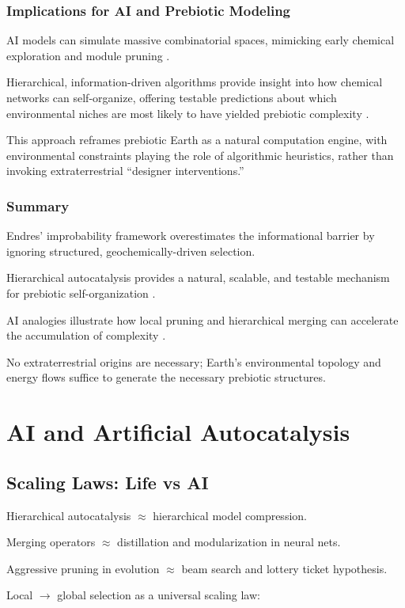 \documentclass{book}
\begin{document}
\section{Implications for AI and Prebiotic Modeling}
AI models can simulate massive combinatorial spaces, mimicking early chemical exploration and module pruning \citep{scalinghypothesis}.

Hierarchical, information-driven algorithms provide insight into how chemical networks can self-organize, offering testable predictions about which environmental niches are most likely to have yielded prebiotic complexity \citep{peng2020}.

This approach reframes prebiotic Earth as a natural computation engine, with environmental constraints playing the role of algorithmic heuristics, rather than invoking extraterrestrial “designer interventions.”

\section{Summary}
Endres’ improbability framework overestimates the informational barrier by ignoring structured, geochemically-driven selection.

Hierarchical autocatalysis provides a natural, scalable, and testable mechanism for prebiotic self-organization \citep{hordijk2013}.

AI analogies illustrate how local pruning and hierarchical merging can accelerate the accumulation of complexity \citep{day2024}.

No extraterrestrial origins are necessary; Earth’s environmental topology and energy flows suffice to generate the necessary prebiotic structures.

\part{AI and Artificial Autocatalysis}

\chapter{Scaling Laws: Life vs AI}
Hierarchical autocatalysis $\approx$ hierarchical model compression.

Merging operators $\approx$ distillation and modularization in neural nets.

Aggressive pruning in evolution $\approx$ beam search and lottery ticket hypothesis.

Local $\to$ global selection as a universal scaling law:
\end{document}
